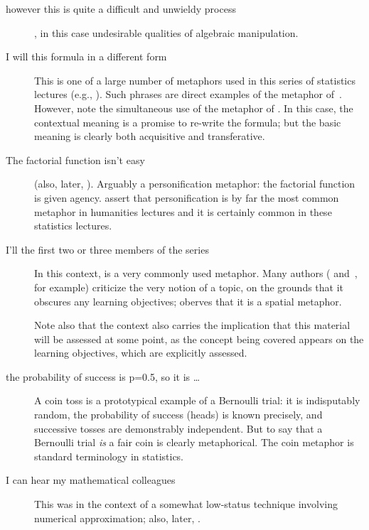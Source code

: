 \begin{description}
\item[however this is quite a difficult and unwieldy process]
  , in this case undesirable qualities of
  algebraic manipulation.
\item[I will  this formula in a different form]
  This is one of a large number of  metaphors used in
  this series of statistics lectures (e.g., ).  Such phrases are
  direct examples of the  metaphor
  of~.  However, note the simultaneous use of the
   metaphor of .  In this
  case, the contextual meaning is a promise to re-write the formula;
  but the basic meaning is clearly both acquisitive and transferative.
\item[The factorial function isn't easy ]{(also, later, ).  Arguably a personification metaphor:
  the factorial function is given agency.   assert that
  personification is by far the most common metaphor in humanities
  lectures and it is certainly common in these statistics lectures.}
\item[I'll  the first two or three members of the
  series]{In this context,  is a very commonly used
  metaphor.  Many authors ( and~,
  for example) criticize the very notion of  a topic,
  on the grounds that it obscures any learning objectives;
   oberves that it is a spatial metaphor.

  Note also that the context also carries the implication that this
  material will be assessed at some point, as the concept being
  covered appears on the learning objectives, which are explicitly
  assessed.}
\item[the probability of success is p=0.5, so it is \ldots] A coin toss is a prototypical example of a Bernoulli
  trial: it is indisputably random, the probability of success (heads)
  is known precisely, and successive tosses are demonstrably
  independent.  But to say that a Bernoulli trial \emph{is} a fair
  coin is clearly metaphorical.  The coin metaphor is standard
  terminology in statistics.
\item[I can hear my mathematical colleagues ]{This was in the context of a somewhat low-status
  technique involving numerical approximation; also, later,
  .

}
\end{description}
